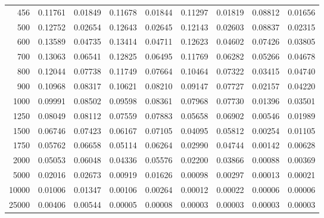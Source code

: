 \begin{table}[ht]
\begin{tabular}{r|c|c|c|c|c|c|c|c}
      456 & 0.11761 & 0.01849 & 0.11678 & 0.01844 & 0.11297 & 0.01819 & 0.08812 & 0.01656 \\
      500 & 0.12752 & 0.02654 & 0.12643 & 0.02645 & 0.12143 & 0.02603 & 0.08837 & 0.02315 \\
      600 & 0.13589 & 0.04735 & 0.13414 & 0.04711 & 0.12623 & 0.04602 & 0.07426 & 0.03805 \\
      700 & 0.13063 & 0.06541 & 0.12825 & 0.06495 & 0.11769 & 0.06282 & 0.05266 & 0.04678 \\
      800 & 0.12044 & 0.07738 & 0.11749 & 0.07664 & 0.10464 & 0.07322 & 0.03415 & 0.04740 \\
      900 & 0.10968 & 0.08317 & 0.10621 & 0.08210 & 0.09147 & 0.07727 & 0.02157 & 0.04220 \\
     1000 & 0.09991 & 0.08502 & 0.09598 & 0.08361 & 0.07968 & 0.07730 & 0.01396 & 0.03501 \\
     1250 & 0.08049 & 0.08112 & 0.07559 & 0.07883 & 0.05658 & 0.06902 & 0.00546 & 0.01989 \\
     1500 & 0.06746 & 0.07423 & 0.06167 & 0.07105 & 0.04095 & 0.05812 & 0.00254 & 0.01105 \\
     1750 & 0.05762 & 0.06658 & 0.05114 & 0.06264 & 0.02990 & 0.04744 & 0.00142 & 0.00628 \\
     2000 & 0.05053 & 0.06048 & 0.04336 & 0.05576 & 0.02200 & 0.03866 & 0.00088 & 0.00369 \\
     5000 & 0.02016 & 0.02673 & 0.00919 & 0.01626 & 0.00098 & 0.00297 & 0.00013 & 0.00021 \\
    10000 & 0.01006 & 0.01347 & 0.00106 & 0.00264 & 0.00012 & 0.00022 & 0.00006 & 0.00006 \\
    25000 & 0.00406 & 0.00544 & 0.00005 & 0.00008 & 0.00003 & 0.00003 & 0.00003 & 0.00003 \\ \cline{1-9}
    \end{tabular}
    \label{tab:XRayEffODE2}
\end{table}